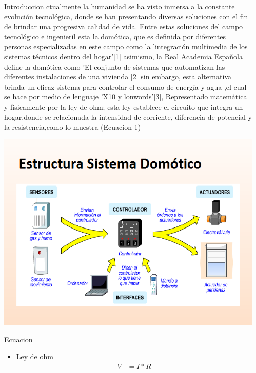 \documentclass{beamer}
\begin{document}
\begin{frame}[fragile]
\begin{columns}[T]
\begin{column}{.48\linewidth}
\end{column}

\begin{column}{.47\textwidth}

\begin{block}{Introduccion}
ctualmente la humanidad se ha visto inmersa a la constante evolución tecnológica, donde se han presentando diversas soluciones con el fin de brindar una progresiva calidad de vida. Entre estas soluciones del campo tecnológico e ingenieril esta la domótica, que es definida por diferentes personas especializadas en este campo como la  'integración multímedia de los sistemas técnicos dentro del hogar'[1] asimismo, la Real Academia Española define la domótica como 'El conjunto de sistemas que automatizan las diferentes instalaciones de una vivienda [2] sin embargo, esta alternativa brinda un eficaz sistema para controlar el consumo de energía y agua ,el cual se hace por medio de lenguaje 'X10 y lonwords'[3], Representado matemática y físicamente por la ley de ohm; esta ley establece el circuito que integra un hogar,donde se relacionada la intensidad de corriente, diferencia de potencial y la resistencia,como lo muestra (Ecuacion 1)
\end{block}


\begin{center}
\includegraphics[width=.9\linewidth]{3.png}
\end{center}

\begin{block}{Ecuacion}
\begin{itemize}
\item Ley de ohm
\begin{align}
V &= I*R
\end{align}
\end{itemize}
\end{block}
\end{column}
\end{columns}






\end{frame}
\end{document}
